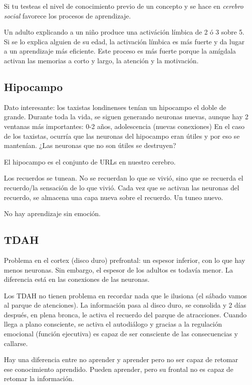 \documentclass[palatino]{apuntes}
\begin{document}
Si tu testeas el nivel de conocimiento previo de un concepto y se hace en \textit{cerebro social} favorece los procesos de aprendizaje.

Un adulto explicando a un niño produce una activáción límbica de 2 ó 3 sobre 5. Si se lo explica alguien de su edad, la activación límbica es más fuerte y da lugar a un aprendizaje más eficiente. 
%
Este proceso es más fuerte porque la amígdala activan las memorias a corto y largo, la atención y la motivación.


\subsection{Hipocampo}

Dato interesante: los taxistas londinenses tenían un hipocampo el doble de grande.
%
Durante toda la vida, se siguen generando neuronas nuevas, aunque hay 2 ventanas más importantes: 0-2 años, adolescencia (nuevas conexiones)
%
En el caso de los taxistas, ocurría que las neuronas del hipocampo eran útiles y por eso se mantenían. ¿Las neuronas que no son útiles se destruyen?

El hipocampo es el conjunto de URLs en nuestro cerebro. 

Los recuerdos se tunean. No se recuerdan lo que se vivió, sino que se recuerda el recuerdo/la sensación de lo que vivió.
%
Cada vez que se activan las neuronas del recuerdo, se almacena una capa nueva sobre el recuerdo. Un tuneo nuevo. 

No hay aprendizaje sin emoción.

\subsection{TDAH}

Problema en el cortex (disco duro) prefrontal: un espesor inferior, con lo que hay menos neuronas. Sin embargo, el espesor de los adultos es todavía menor.
%
La diferencia está en las conexiones de las neuronas.

Los TDAH no tienen problema en recordar nada que le ilusiona (el sábado vamos al parque de atenciones). La información pasa al disco duro, se consolida y 2 días después, en plena bronca, le activa el recuerdo del parque de atracciones. Cuando llega a plano consciente, se activa el autodiálogo y gracias a la regulación emocional (función ejecutiva) es capaz de ser consciente de las consecuencias y callarse.


Hay una diferencia entre no aprender y aprender pero no ser capaz de retomar ese conocimiento aprendido. 
%
Pueden aprender, pero su frontal no es capaz de retomar la información.
\end{document}
